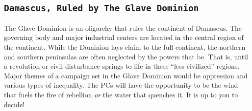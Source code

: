 \documentclass[12pt]{article}
\begin{document}
\begin{figure}[!h]
\begin{center}
\end{center}
\label{fig:world_map}
\end{figure}

\subsection*{\texttt{Damascus, Ruled by The Glave Dominion}} 
\textsf{The Glave Dominion is an oligarchy that rules the continent of Damascus. The governing body and major industrial centers are located in the central region of the continent. While the Dominion lays claim to the full continent, the northern and southern peninsulas are often neglected by the powers that be. That is, until a revolution or civil disturbance springs to life in these ``less civilized'' regions. Major themes of a campaign set in the Glave Dominion would be oppression and various types of inequality. The PCs will have the opportunity to be the wind that fuels the fire of rebellion \textit{or} the water that quenches it. It is up to you to decide!}

%
\end{document}
